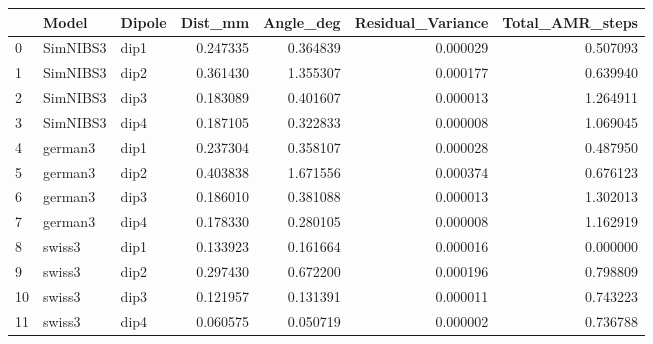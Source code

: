 \begin{tabular}{lllrrrr}
\toprule
{} &     Model & Dipole &   Dist\_mm &  Angle\_deg &  Residual\_Variance &  Total\_AMR\_steps \\
\midrule
0  &  SimNIBS3 &   dip1 &  0.247335 &   0.364839 &           0.000029 &         0.507093 \\
1  &  SimNIBS3 &   dip2 &  0.361430 &   1.355307 &           0.000177 &         0.639940 \\
2  &  SimNIBS3 &   dip3 &  0.183089 &   0.401607 &           0.000013 &         1.264911 \\
3  &  SimNIBS3 &   dip4 &  0.187105 &   0.322833 &           0.000008 &         1.069045 \\
4  &   german3 &   dip1 &  0.237304 &   0.358107 &           0.000028 &         0.487950 \\
5  &   german3 &   dip2 &  0.403838 &   1.671556 &           0.000374 &         0.676123 \\
6  &   german3 &   dip3 &  0.186010 &   0.381088 &           0.000013 &         1.302013 \\
7  &   german3 &   dip4 &  0.178330 &   0.280105 &           0.000008 &         1.162919 \\
8  &    swiss3 &   dip1 &  0.133923 &   0.161664 &           0.000016 &         0.000000 \\
9  &    swiss3 &   dip2 &  0.297430 &   0.672200 &           0.000196 &         0.798809 \\
10 &    swiss3 &   dip3 &  0.121957 &   0.131391 &           0.000011 &         0.743223 \\
11 &    swiss3 &   dip4 &  0.060575 &   0.050719 &           0.000002 &         0.736788 \\
\bottomrule
\end{tabular}


